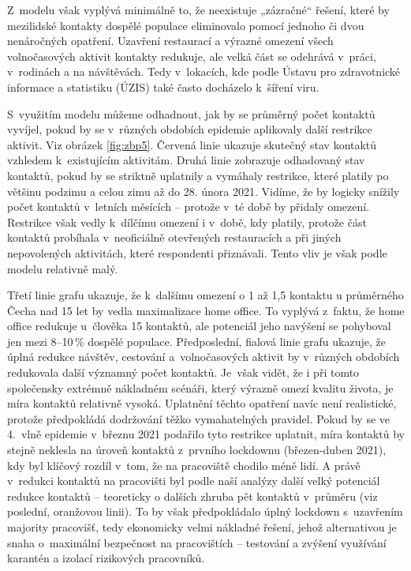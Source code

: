 Z modelu však vyplývá minimálně to, že neexistuje „zázračné“ řešení, které by mezilidské kontakty dospělé populace eliminovalo pomocí jednoho či dvou nenáročných opatření. Uzavření restaurací a výrazné omezení všech volnočasových aktivit kontakty redukuje, ale velká část se odehrává v práci, v rodinách a na návštěvách. Tedy v lokacích, kde podle Ústavu pro zdravotnické informace a statistiku (ÚZIS) také často docházelo k šíření viru.

S využitím modelu můžeme odhadnout, jak by se průměrný počet kontaktů vyvíjel, pokud by se v různých obdobích epidemie aplikovaly další restrikce aktivit. Viz obrázek \ref{fig:zbp5}. Červená linie ukazuje skutečný stav kontaktů vzhledem k existujícím aktivitám. Druhá linie zobrazuje odhadovaný stav kontaktů, pokud by se striktně uplatnily a vymáhaly restrikce, které platily po většinu podzimu a celou zimu až do 28. února 2021. Vidíme, že by logicky snížily počet kontaktů v letních měsících – protože v té době by přidaly omezení. Restrikce však vedly k dílčímu omezení i v době, kdy platily, protože část kontaktů probíhala v neoficiálně otevřených restauracích a při jiných nepovolených aktivitách, které respondenti přiznávali. Tento vliv je však podle modelu relativně malý. 

Třetí linie grafu ukazuje, že k dalšímu omezení o 1 až 1,5 kontaktu u průměrného Čecha nad 15 let by vedla maximalizace home office. To vyplývá z faktu, že home office redukuje u člověka 15 kontaktů, ale potenciál jeho navýšení se pohyboval jen mezi 8--10\,\% dospělé populace. Předposlední, fialová linie grafu ukazuje, že úplná redukce návštěv, cestování a volnočasových aktivit by v různých obdobích redukovala další významný počet kontaktů. Je však vidět, že i při tomto společensky extrémně nákladném scénáři, který výrazně omezí kvalitu života, je míra kontaktů relativně vysoká. Uplatnění těchto opatření navíc není realistické, protože předpokládá dodržování těžko vymahatelných pravidel. Pokud by se ve 4. vlně epidemie v březnu 2021 podařilo tyto restrikce uplatnit, míra kontaktů by stejně neklesla na úroveň kontaktů z prvního lockdownu (březen-duben 2021), kdy byl klíčový rozdíl v tom, že na pracoviště chodilo méně lidí. A právě v redukci kontaktů na pracovišti byl podle naší analýzy další velký potenciál redukce kontaktů – teoreticky o dalších zhruba pět kontaktů v průměru (viz poslední, oranžovou linii). To by však předpokládalo úplný lockdown s uzavřením majority pracovišť, tedy ekonomicky velmi nákladné řešení, jehož alternativou je snaha o maximální bezpečnost na pracovištích – testování a zvýšení využívání karantén a izolací rizikových pracovníků.

